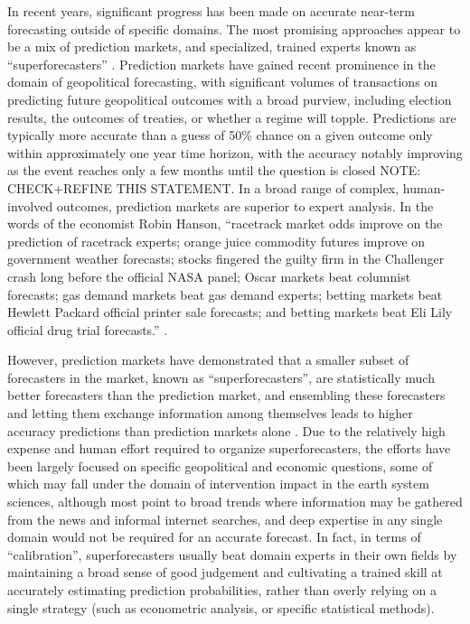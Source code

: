 \documentclass[12pt,a4paper]{article}
\begin{document}
In recent years, significant progress has been made on accurate near-term forecasting outside of specific domains. The most promising approaches appear to be a mix of prediction markets, and specialized, trained experts known as ``superforecasters'' . Prediction markets have gained recent prominence in the domain of geopolitical forecasting, with significant volumes of transactions on predicting future geopolitical outcomes with a broad purview, including election results, the outcomes of treaties, or whether a regime will topple. Predictions are typically more accurate than a guess of 50\% chance on a given outcome only within approximately one year time horizon, with the accuracy notably improving as the event reaches only a few months until the question is closed  NOTE: CHECK+REFINE THIS STATEMENT.  In a broad range of complex, human-involved outcomes, prediction markets are superior to expert analysis. In the words of the economist Robin Hanson, ``racetrack market odds improve on the prediction of racetrack  experts; orange juice commodity futures improve on government weather forecasts;  stocks fingered the guilty firm in the Challenger crash long before the official NASA  panel; Oscar markets beat columnist forecasts; gas demand markets beat gas  demand experts; betting markets beat Hewlett Packard official printer sale  forecasts; and betting markets beat Eli Lily official drug trial forecasts.''  . 

However, prediction markets have demonstrated that a smaller subset of forecasters in the market, known as ``superforecasters'', are statistically much better forecasters than the prediction market, and ensembling these forecasters and letting them exchange information among themselves leads to higher accuracy predictions than prediction markets alone . Due to the relatively high expense and human effort required to organize superforecasters, the efforts have been largely focused on specific geopolitical and economic questions, some of which may fall under the domain of intervention impact in the earth system sciences, although most point to broad trends where information may be gathered from the news and informal internet searches, and deep expertise in any single domain would not be required for an accurate forecast. In fact, in terms of ``calibration'', superforecasters usually beat domain experts in their own fields by maintaining a broad sense of good judgement and cultivating a trained skill at accurately estimating prediction probabilities, rather than overly relying on a single strategy (such as econometric analysis, or specific statistical methods).
\end{document}
